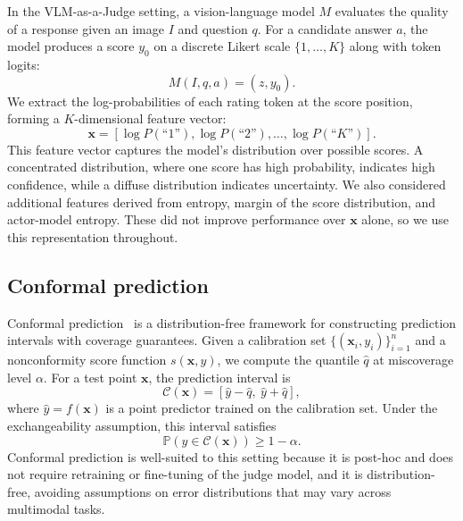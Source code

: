 \documentclass{article}
\begin{document}
In the VLM-as-a-Judge setting, a vision-language model $M$ evaluates the quality of a response given an image $I$ and question $q$. For a candidate answer $a$, the model produces a score $y_0$ on a discrete Likert scale $\{1, \ldots, K\}$ along with token logits:
\begin{equation}
M(I, q, a) = (z, y_0).
\end{equation}
We extract the log-probabilities of each rating token at the score position, forming a $K$-dimensional feature vector:
\begin{equation}
\mathbf{x} = [\log P(\text{``1''}), \log P(\text{``2''}), \ldots, \log P(\text{``$K$''})].
\label{eq:features}
\end{equation}
This feature vector captures the model's distribution over possible scores. A concentrated distribution, where one score has high probability, indicates high confidence, while a diffuse distribution indicates uncertainty. We also considered additional features derived from entropy, margin of the score distribution, and actor-model entropy. These did not improve performance over $\mathbf{x}$ alone, so we use this representation throughout. 

\subsection{Conformal prediction}

Conformal prediction~\citep{vovk2005algorithmic} is a distribution-free framework for constructing prediction intervals with coverage guarantees. Given a calibration set $\{(\mathbf{x}_i, y_i)\}_{i=1}^n$ and a nonconformity score function $s(\mathbf{x}, y)$, we compute the quantile $\hat{q}$ at miscoverage level $\alpha$. For a test point $\mathbf{x}$, the prediction interval is
\begin{equation}
\mathcal{C}(\mathbf{x}) = [\hat{y} - \hat{q},\ \hat{y} + \hat{q}],
\end{equation}
where $\hat{y} = f(\mathbf{x})$ is a point predictor trained on the calibration set. Under the exchangeability assumption, this interval satisfies
\begin{equation}
\mathbb{P}(y \in \mathcal{C}(\mathbf{x})) \geq 1 - \alpha.
\end{equation}
Conformal prediction is well-suited to this setting because it is post-hoc and does not require retraining or fine-tuning of the judge model, and it is distribution-free, avoiding assumptions on error distributions that may vary across multimodal tasks.
\end{document}
